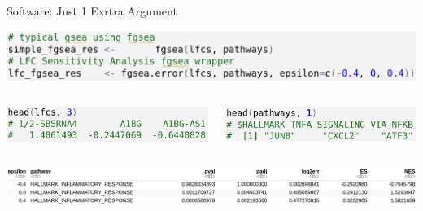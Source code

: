 \documentclass{beamer}
\begin{document}
\begin{frame}[label={sec:org6ffa9d4},fragile]{Software: Just 1 Exrtra Argument}

\begin{center}
\includegraphics[width=1\linewidth]{./images/fgsea_example.png}
\end{center}
\begin{columns}
\begin{column}{0.5\columnwidth}
\begin{center}
\includegraphics[width=0.85\linewidth]{./images/lfcs.png}
\end{center}
\end{column}
\begin{column}{0.5\columnwidth}
\begin{center}
\includegraphics[width=0.85\linewidth]{./images/pathways.png}
\end{center}
\end{column}
\end{columns}

\pause
\begin{center}
\includegraphics[width=1\linewidth]{./images/lfc_sens_output.png}
\end{center}


\end{frame}
\end{document}
